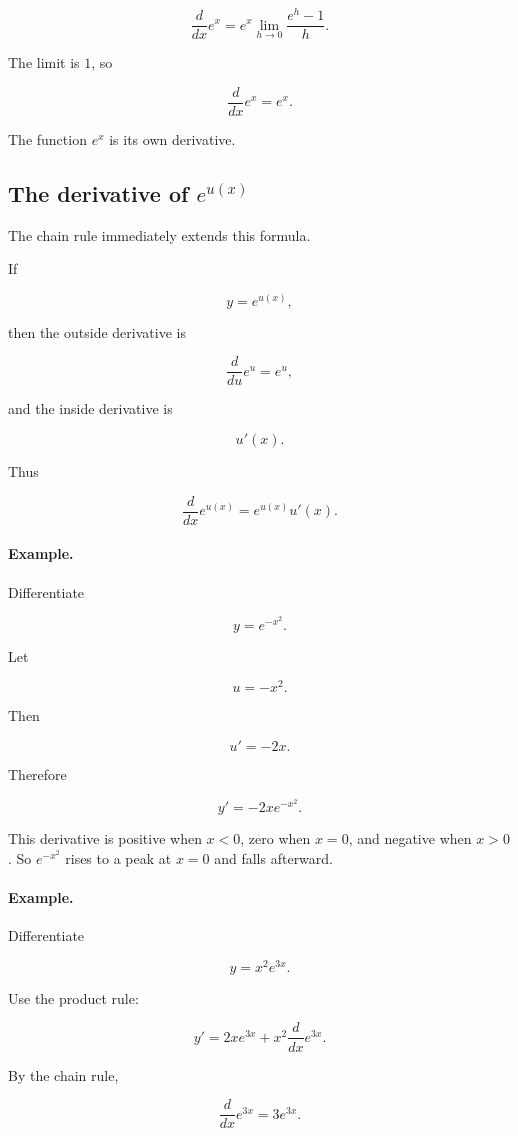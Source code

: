 \[
\frac{d}{dx}e^x
=
e^x\lim_{h\to0}\frac{e^h-1}{h}.
\]

The limit is \(1\), so

\[
\boxed{
\frac{d}{dx}e^x=e^x.
}
\]

The function \(e^x\) is its own derivative.

\subsection{The derivative of \texorpdfstring{\(e^{u(x)}\)}{e to u of x}}
\label{subsec:derivative-e-to-u}

The chain rule immediately extends this formula.

If

\[
y=e^{u(x)},
\]

then the outside derivative is

\[
\frac{d}{du}e^u=e^u,
\]

and the inside derivative is

\[
u'(x).
\]

Thus

\[
\boxed{
\frac{d}{dx}e^{u(x)}=e^{u(x)}u'(x).
}
\]

\paragraph{Example.}
Differentiate

\[
y=e^{-x^2}.
\]

Let

\[
u=-x^2.
\]

Then

\[
u'=-2x.
\]

Therefore

\[
\boxed{
y'=-2xe^{-x^2}.
}
\]

This derivative is positive when \(x<0\), zero when \(x=0\), and negative when \(x>0\).  So \(e^{-x^2}\) rises to a peak at \(x=0\) and falls afterward.

\paragraph{Example.}
Differentiate

\[
y=x^2e^{3x}.
\]

Use the product rule:

\[
y'
=
2xe^{3x}+x^2\frac{d}{dx}e^{3x}.
\]

By the chain rule,

\[
\frac{d}{dx}e^{3x}=3e^{3x}.
\]

